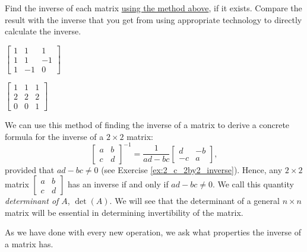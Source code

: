 \begin{activity}  \label{act:2_c_3} Find the inverse of each matrix \underline{using the method above}, if it exists. Compare the result with the inverse that you get from using appropriate technology to directly calculate the inverse. 
\ba
\item $\left[ \begin {array}{crr} 1&1&1\\ 1&1&-1\\ 1&-1&0 \end {array} \right]$



\item $\left[ \begin {array}{cccc} 1&1&1\\ 2&2&2\\ 0&0&1 \end {array} \right]$

\ea

\end{activity}



We can use this method of finding the inverse of a matrix to derive a concrete formula for the inverse of a $2 \times 2$ matrix: 
\begin{equation} \label{eq:2_c_1}
\left[ \begin{array}{cc} a&b \\ c&d \end{array} \right]^{-1} = \frac{1}{ad-bc} \left[ \begin{array}{rr} d&-b \\ -c&a \end{array} \right],
\end{equation}
provided that $ad-bc \neq 0$ (see Exercise \ref{ex:2_c_2by2_inverse}). Hence, any $2\times 2$ matrix $\left[ \begin{array}{cc} a&b \\ c&d \end{array} \right]$ has an inverse if and only if $ad-bc\neq 0$. We call this quantity \emph{determinant of $A$}, $\det(A)$. We will see that the determinant of a general $n\times n$ matrix will be essential in determining invertibility of the matrix.



As we have done with every new operation, we ask what properties the inverse of a matrix has. 



